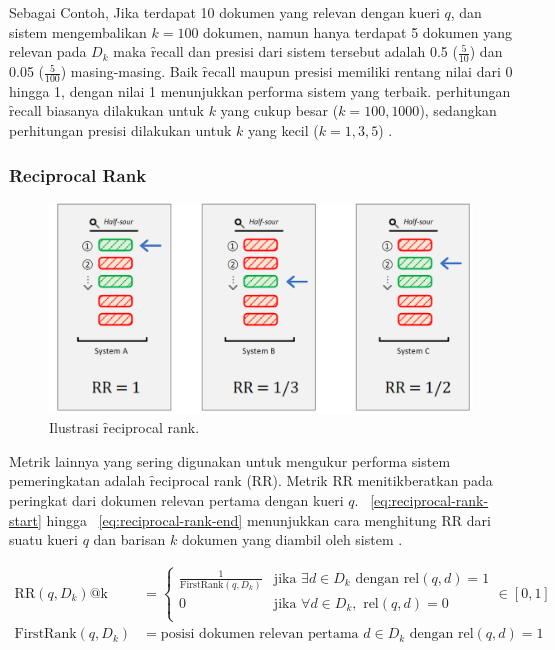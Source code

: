         Sebagai Contoh, Jika terdapat 10 dokumen yang relevan dengan kueri $q$, dan sistem mengembalikan $k=100$ dokumen, namun hanya terdapat 5 dokumen yang relevan pada $D_k$  maka \f{recall} dan presisi dari sistem tersebut adalah 0.5 ($\frac{5}{10}$) dan 0.05 ($\frac{5}{100}$) masing-masing. Baik \f{recall} maupun presisi memiliki rentang nilai dari 0 hingga 1, dengan nilai 1 menunjukkan performa sistem yang terbaik. perhitungan \f{recall} biasanya dilakukan untuk $k$ yang cukup besar ($k = 100,1000 $), sedangkan perhitungan presisi dilakukan untuk $k$ yang kecil ($k = 1, 3, 5$) \citep{irlecture}.


        \subsubsection{\f{Reciprocal Rank}}

        \begin{figure}
            \centering
            \includegraphics[width=1\textwidth]{assets/pics/rr.png}
            \caption{Ilustrasi \f{reciprocal rank}.}
            \label{fig:reciprocal-rank}
        \end{figure}

        Metrik lainnya yang sering digunakan untuk mengukur performa sistem pemeringkatan adalah \f{reciprocal rank} (RR). Metrik RR menitikberatkan pada peringkat dari dokumen relevan pertama dengan kueri $q$. \equ~\ref{eq:reciprocal-rank-start} hingga \equ~\ref{eq:reciprocal-rank-end} menunjukkan cara menghitung RR dari suatu kueri $q$ dan barisan $k$ dokumen yang diambil oleh sistem \citep{irlejcture, textrankingsurvey}.

        \begin{align}
            \text{RR}(q, D_k)\text{@k} &= \begin{cases}
                \label{eq:reciprocal-rank-start}
                \frac{1}{\text{FirstRank}(q, D_k)} & \text{jika } \exists d \in D_k \text{ dengan } \text{rel}(q, d) = 1 \\        
                0 & \text{jika } \forall d \in D_k, \text{ rel}(q, d) = 0 \\
                \end{cases} \in [0, 1] \\
                \label{eq:reciprocal-rank-end}
                \text{FirstRank}(q,D_k) &= \text{posisi dokumen relevan pertama } d\in D_k \text{ dengan } \text{rel}(q, d) = 1
        \end{align}

